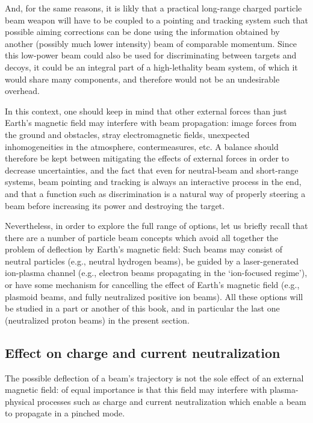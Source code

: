\documentclass [12pt,a4paper,     ]{report} %
\begin{document}
  And, for the same reasons, it is likly that a practical long-range charged particle beam weapon will have to be coupled to a pointing and tracking system such that possible aiming corrections can be done using the information obtained by another (possibly much lower intensity) beam of comparable momentum.  Since this low-power beam could also be used for discriminating between targets and decoys, it could be an integral part of a high-lethality beam system, of which it would share many components, and therefore would not be an undesirable overhead.  

  In this context, one should keep in mind that other external forces than just Earth's magnetic field may interfere with beam propagation: image forces from the ground and obstacles, stray electromagnetic fields, unexpected inhomogeneities in the atmosphere, contermeasures, etc.  A balance should therefore be kept between mitigating the effects of external forces in order to decrease uncertainties, and the fact that even for neutral-beam and short-range systems, beam pointing and tracking is always an interactive process in the end, and that a function such as discrimination is a natural way of properly steering a beam before increasing its power and destroying the target.


  Nevertheless, in order to explore the full range of options, let us briefly recall that there are a number of particle beam concepts which avoid all together the problem of deflection by Earth's magnetic field:  Such beams may consist of neutral particles (e.g., neutral hydrogen beams), be guided by a laser-generated ion-plasma channel (e.g., electron beams propagating in the `ion-focused regime'), or have some mechanism for cancelling the effect of Earth's magnetic field (e.g., plasmoid beams, and fully neutralized positive ion beams).  All these options will be studied in a part or another of this book, and in particular the last one (neutralized proton beams) in the present section. 


\subsection{Effect on charge and current neutralization}

   The possible deflection of a beam's trajectory is not the sole effect of an external magnetic field: of equal importance is that this field may interfere with plasma-physical processes such as charge and current neutralization which enable a beam to propagate in a pinched mode. 
\end{document}
